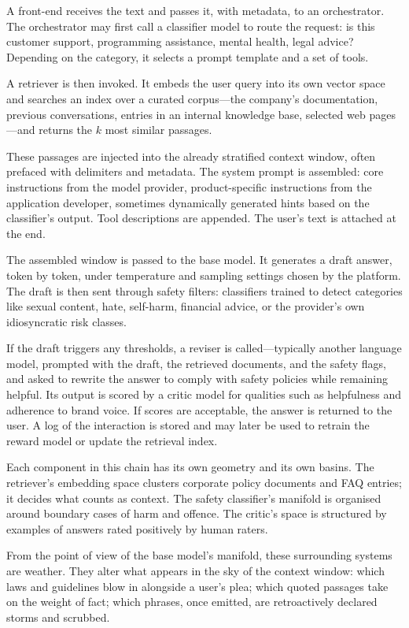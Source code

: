 \documentclass[12pt,a4paper]{article}
\begin{document}
A front-end receives the text and passes it, with metadata, to an orchestrator. The orchestrator may first call a classifier model to route the request: is this customer support, programming assistance, mental health, legal advice? Depending on the category, it selects a prompt template and a set of tools.

A retriever is then invoked. It embeds the user query into its own vector space and searches an index over a curated corpus---the company's documentation, previous conversations, entries in an internal knowledge base, selected web pages---and returns the $k$ most similar passages.

These passages are injected into the already stratified context window, often prefaced with delimiters and metadata. The system prompt is assembled: core instructions from the model provider, product-specific instructions from the application developer, sometimes dynamically generated hints based on the classifier's output. Tool descriptions are appended. The user's text is attached at the end.

The assembled window is passed to the base model. It generates a draft answer, token by token, under temperature and sampling settings chosen by the platform. The draft is then sent through safety filters: classifiers trained to detect categories like sexual content, hate, self-harm, financial advice, or the provider's own idiosyncratic risk classes.

If the draft triggers any thresholds, a reviser is called---typically another language model, prompted with the draft, the retrieved documents, and the safety flags, and asked to rewrite the answer to comply with safety policies while remaining helpful. Its output is scored by a critic model for qualities such as helpfulness and adherence to brand voice. If scores are acceptable, the answer is returned to the user. A log of the interaction is stored and may later be used to retrain the reward model or update the retrieval index.

Each component in this chain has its own geometry and its own basins. The retriever's embedding space clusters corporate policy documents and FAQ entries; it decides what counts as context. The safety classifier's manifold is organised around boundary cases of harm and offence. The critic's space is structured by examples of answers rated positively by human raters.

From the point of view of the base model's manifold, these surrounding systems are weather. They alter what appears in the sky of the context window: which laws and guidelines blow in alongside a user's plea; which quoted passages take on the weight of fact; which phrases, once emitted, are retroactively declared storms and scrubbed.
\end{document}
